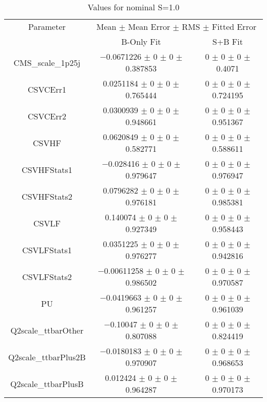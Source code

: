 \begin{table}
\centering
\caption{Values for nominal S=1.0}
\begin{tabular}{ccc}
\toprule
Parameter & \multicolumn{2}{c}{Mean $\pm$ Mean Error $\pm$ RMS $\pm$ Fitted Error}\\
 & B-Only Fit & S+B Fit\\
\midrule
CMS\_scale\_1p25j & \num{-0.0671226} $\pm$ \num{0} $\pm$ \num{0} $\pm$ \num{0.387853} & \num{0} $\pm$ \num{0} $\pm$ \num{0} $\pm$ \num{0.4071}\\
CSVCErr1 & \num{0.0251184} $\pm$ \num{0} $\pm$ \num{0} $\pm$ \num{0.765444} & \num{0} $\pm$ \num{0} $\pm$ \num{0} $\pm$ \num{0.724195}\\
CSVCErr2 & \num{0.0300939} $\pm$ \num{0} $\pm$ \num{0} $\pm$ \num{0.948661} & \num{0} $\pm$ \num{0} $\pm$ \num{0} $\pm$ \num{0.951367}\\
CSVHF & \num{0.0620849} $\pm$ \num{0} $\pm$ \num{0} $\pm$ \num{0.582771} & \num{0} $\pm$ \num{0} $\pm$ \num{0} $\pm$ \num{0.588611}\\
CSVHFStats1 & \num{-0.028416} $\pm$ \num{0} $\pm$ \num{0} $\pm$ \num{0.979647} & \num{0} $\pm$ \num{0} $\pm$ \num{0} $\pm$ \num{0.976947}\\
CSVHFStats2 & \num{0.0796282} $\pm$ \num{0} $\pm$ \num{0} $\pm$ \num{0.976181} & \num{0} $\pm$ \num{0} $\pm$ \num{0} $\pm$ \num{0.985381}\\
CSVLF & \num{0.140074} $\pm$ \num{0} $\pm$ \num{0} $\pm$ \num{0.927349} & \num{0} $\pm$ \num{0} $\pm$ \num{0} $\pm$ \num{0.958443}\\
CSVLFStats1 & \num{0.0351225} $\pm$ \num{0} $\pm$ \num{0} $\pm$ \num{0.976277} & \num{0} $\pm$ \num{0} $\pm$ \num{0} $\pm$ \num{0.942816}\\
CSVLFStats2 & \num{-0.00611258} $\pm$ \num{0} $\pm$ \num{0} $\pm$ \num{0.986502} & \num{0} $\pm$ \num{0} $\pm$ \num{0} $\pm$ \num{0.970587}\\
PU & \num{-0.0419663} $\pm$ \num{0} $\pm$ \num{0} $\pm$ \num{0.961257} & \num{0} $\pm$ \num{0} $\pm$ \num{0} $\pm$ \num{0.961039}\\
Q2scale\_ttbarOther & \num{-0.10047} $\pm$ \num{0} $\pm$ \num{0} $\pm$ \num{0.807088} & \num{0} $\pm$ \num{0} $\pm$ \num{0} $\pm$ \num{0.824419}\\
Q2scale\_ttbarPlus2B & \num{-0.0180183} $\pm$ \num{0} $\pm$ \num{0} $\pm$ \num{0.970907} & \num{0} $\pm$ \num{0} $\pm$ \num{0} $\pm$ \num{0.968653}\\
Q2scale\_ttbarPlusB & \num{0.012424} $\pm$ \num{0} $\pm$ \num{0} $\pm$ \num{0.964287} & \num{0} $\pm$ \num{0} $\pm$ \num{0} $\pm$ \num{0.970173}\\

\end{tabular}
\end{table}
